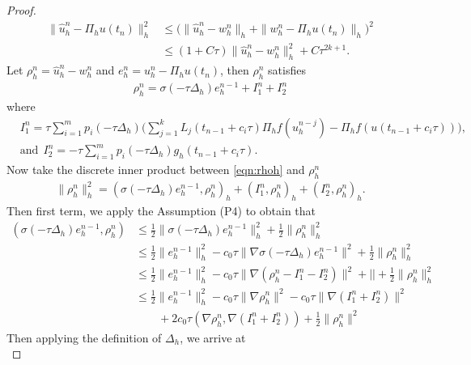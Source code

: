\begin{proof}
\begin{equation}\label{eqn:split}
\begin{split}
\| \hat u_h^n - \Pi_h u(t_n)  \|_h^2 &\le \Big(\| \hat u_h^n - w_h^n \|_h + \|w_h^n - \Pi_h u(t_n)   \|_h \Big)^2 \\
&\le (1+C\tau) \| \hat u_h^n - w_h^n \|_h^2 + C\tau^{2k+1}.
\end{split}
\end{equation}
Let $\rho_h^n = \hat u_h^n  - w_h^n $ and $e_h^n = u_h^n - \Pi_h u(t_n)$, then $\rho_h^n$ satisfies
\begin{align}\label{eqn:rhoh}
\rho_h^n = \sigma(-\tau \Delta_h) e_h^{n-1} + I_1^n + I_2^n
\end{align}
where
\begin{align*}
&  I_1^n = \tau \sum_{i=1}^m p_i(-\tau \Delta_h) \Big(
\sum_{j=1}^{k} L_j (t_{n-1} + c_i\tau) \Pi_h f(u_h^{n-j}) - \Pi_h f(u(t_{n-1}+c_i\tau)) \Big) ,\\
& \text{and}~~
I_2^n = - \tau \sum_{i=1}^m p_i(-\tau \Delta_h) g_h(t_{n-1}+c_i\tau).
\end{align*}
Now take the discrete inner product between \eqref{eqn:rhoh} and $\rho_h^n$
\begin{align*}
 \| \rho_h^n \|_h^2 = (\sigma(-\tau \Delta_h) e_h^{n-1}, \rho_h^n)_h + (I_1^n,\rho_h^n)_h + (I_2^n,\rho_h^n)_h.
\end{align*}
Then first term, we apply the Assumption (P4) to obtain that
\begin{align*}
(\sigma(-\tau \Delta_h) e_h^{n-1}, \rho_h^n) &\le \frac12\|  \sigma(-\tau \Delta_h) e_h^{n-1} \|_h^2 + \frac12\| \rho_h^n\|_h^2 \\
&\le \frac12\|  e_h^{n-1} \|_h^2 - c_0\tau \| \nabla \sigma(-\tau \Delta_h) e_h^{n-1} \|^2 + \frac12\| \rho_h^n\|_h^2\\
&\le \frac12\|  e_h^{n-1} \|_h^2 - c_0\tau \| \nabla (\rho_h^n - I_1^n - I_2^n) \|^2 + |  |+ \frac12\| \rho_h^n\|_h^2\\
&\le \frac12\|  e_h^{n-1} \|_h^2 - c_0\tau \| \nabla \rho_h^n\|^2 - c_0\tau \| \nabla(I_1^n +I_2^n) \|^2\\
&\qquad+2c_0 \tau (\nabla \rho_h^n,\nabla (I_1^n +I_2^n))+ \frac12\| \rho_h^n\|^2
\end{align*}
Then applying the definition of $\Delta_h$, we arrive at
\begin{equation}\label{eqn:rhoh-3}

\end{equation}
\end{proof}
